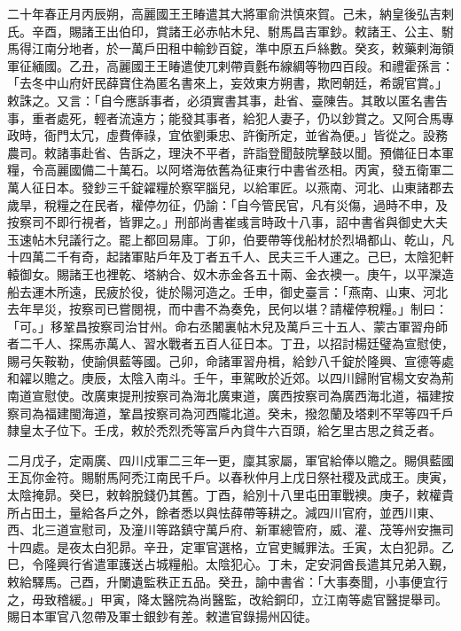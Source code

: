 \begin{pinyinscope}
 二十年春正月丙辰朔，高麗國王王睶遣其大將軍俞洪慎來賀。己未，納皇後弘吉剌氏。辛酉，賜諸王出伯印，賞諸王必赤帖木兒、駙馬昌吉軍鈔。敕諸王、公主、駙馬得江南分地者，於一萬戶田租中輸鈔百錠，準中原五戶絲數。癸亥，敕藥剌海領軍征緬國。乙丑，高麗國王王睶遣使兀剌帶貢氎布線綢等物四百段。和禮霍孫言：「去冬中山府奸民薛寶住為匿名書來上，妄效東方朔書，欺罔朝廷，希覬官賞。」敕誅之。又言：「自今應訴事者，必須實書其事，赴省、臺陳告。其敢以匿名書告事，重者處死，輕者流遠方；能發其事者，給犯人妻子，仍以鈔賞之。又阿合馬專政時，衙門太冗，虛費俸祿，宜依劉秉忠、許衡所定，並省為便。」皆從之。設務農司。敕諸事赴省、告訴之，理決不平者，許詣登聞鼓院擊鼓以聞。預備征日本軍糧，令高麗國備二十萬石。以阿塔海依舊為征東行中書省丞相。丙寅，發五衛軍二萬人征日本。發鈔三千錠糴糧於察罕腦兒，以給軍匠。以燕南、河北、山東諸郡去歲旱，稅糧之在民者，權停勿征，仍諭：「自今管民官，凡有災傷，過時不申，及按察司不即行視者，皆罪之。」刑部尚書崔彧言時政十八事，詔中書省與御史大夫玉速帖木兒議行之。罷上都回易庫。丁卯，伯要帶等伐船材於烈堝都山、乾山，凡十四萬二千有奇，起諸軍貼戶年及丁者五千人、民夫三千人運之。己巳，太陰犯軒轅御女。賜諸王也裡乾、塔納合、奴木赤金各五十兩、金衣襖一。庚午，以平灤造船去運木所遠，民疲於役，徙於陽河造之。壬申，御史臺言：「燕南、山東、河北去年旱災，按察司已嘗閱視，而中書不為奏免，民何以堪？請權停稅糧。」制曰：「可。」移鞏昌按察司治甘州。命右丞闍裏帖木兒及萬戶三十五人、蒙古軍習舟師者二千人、探馬赤萬人、習水戰者五百人征日本。丁丑，以招討楊廷璧為宣慰使，賜弓矢鞍勒，使諭俱藍等國。己卯，命諸軍習舟楫，給鈔八千錠於隆興、宣德等處和糴以贍之。庚辰，太陰入南斗。壬午，車駕畋於近郊。以四川歸附官楊文安為荊南道宣慰使。改廣東提刑按察司為海北廣東道，廣西按察司為廣西海北道，福建按察司為福建閩海道，鞏昌按察司為河西隴北道。癸未，撥忽蘭及塔剌不罕等四千戶隸皇太子位下。壬戌，敕於禿烈禿等富戶內貸牛六百頭，給乞里古思之貧乏者。



 二月戊子，定兩廣、四川戍軍二三年一更，廩其家屬，軍官給俸以贍之。賜俱藍國王瓦你金符。賜駙馬阿禿江南民千戶。以春秋仲月上戊日祭社稷及武成王。庚寅，太陰掩昴。癸巳，敕斡脫錢仍其舊。丁酉，給別十八里屯田軍戰襖。庚子，敕權貴所占田土，量給各戶之外，餘者悉以與怯薛帶等耕之。減四川官府，並西川東、西、北三道宣慰司，及潼川等路鎮守萬戶府、新軍總管府，威、灌、茂等州安撫司十四處。是夜太白犯昴。辛丑，定軍官選格，立官吏贓罪法。壬寅，太白犯昴。乙巳，令隆興行省遣軍護送占城糧船。太陰犯心。丁未，定安洞酋長遣其兄弟入覲，敕給驛馬。己酉，升闌遺監秩正五品。癸丑，諭中書省：「大事奏聞，小事便宜行之，毋致稽緩。」甲寅，降太醫院為尚醫監，改給銅印，立江南等處官醫提舉司。賜日本軍官八忽帶及軍士銀鈔有差。敕遣官錄揚州囚徒。




\end{pinyinscope}
